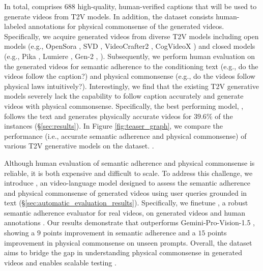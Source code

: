 In total, \name{} comprises 688 high-quality, human-verified captions that will be used to generate videos from T2V models. In addition, the dataset consists human-labeled annotations for physical commonsense of the generated videos. Specifically, we acquire generated videos from  diverse T2V models including open models (e.g., OpenSora \cite{OpenSora}, SVD \cite{blattmann2023stable}, VideoCrafter2 \cite{chen2024videocrafter2}, CogVideoX \cite{yang2024cogvideox}) and closed models (e.g., Pika \cite{pika}, Lumiere \cite{bar2024lumiere}, Gen-2 \cite{gen2}, ). Subsequently, we perform human evaluation on the generated videos for semantic adherence to the conditioning text (e.g., do the videos follow the caption?) and physical commonsense (e.g., do the videos follow physical laws intuitively?). Interestingly, we find that the existing T2V generative models severely lack the capability to follow caption accurately and generate videos with physical commonsense. Specifically, the best performing model, , follows the text and generates physically accurate videos for $39.6\%$ of the instances (\S \ref{sec:results}). 
In Figure \ref{fig:teaser_graph}, we compare the performance (i.e., accurate semantic adherence and physical commonsense) of various T2V generative models on the \name{} dataset. . 

Although human evaluation of semantic adherence and physical commonsense is reliable, it is both expensive and difficult to scale. To address this challenge, we introduce \model{}, an  video-language model designed to assess the semantic adherence and physical commonsense of generated videos using user queries grounded in text (\S \ref{sec:automatic_evaluation_results}). Specifically, we finetune \videocon{} \cite{bansal2023videocon}, a robust semantic adherence evaluator for real videos, on generated videos and human annotations . Our results demonstrate that \model{} outperforms Gemini-Pro-Vision-1.5 \cite{reid2024gemini}, showing a $9$ points improvement in semantic adherence and a $15$ points improvement in physical commonsense on unseen prompts.  Overall, the \name{} dataset aims to bridge the gap in understanding physical commonsense in generated videos and enables scalable testing .